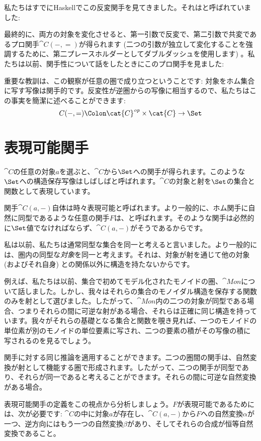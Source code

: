 私たちはすでにHaskellでこの反変関手を見てきました。それはと呼ばれていました: 


最終的に、両方の対象を変化させると、第一引数で反変で、第二引数で共変であるプロ関手$\cat{C}(-, =)$が得られます (二つの引数が独立して変化することを強調するために、第二プレースホルダーとしてダブルダッシュを使用します) 。私たちは以前、関手性について話をしたときにこのプロ関手を見ました: 

重要な教訓は、この観察が任意の圏で成り立つということです: 対象をホム集合に写す写像は関手的です。反変性が逆圏からの写像に相当するので、私たちはこの事実を簡潔に述べることができます: 
\[C(-, =) \Colon \cat{C}^\mathit{op} \times \cat{C} \to \Set\]

\section{表現可能関手}

$\cat{C}$の任意の対象$a$を選ぶと、$\cat{C}$から$\Set$への関手が得られます。このような$\Set$への構造保存写像はしばしばと呼ばれます。$\cat{C}$の対象と射を$\Set$の集合と関数として表現しています。

関手$\cat{C}(a, -)$自体は時々表現可能と呼ばれます。より一般的に、ホム関手に自然に同型であるような任意の関手$F$は、と呼ばれます。そのような関手は必然的に$\Set$値でなければならず、$\cat{C}(a, -)$がそうであるからです。

私は以前、私たちは通常同型な集合を同一と考えると言いました。より一般的には、圏内の同型な\emph{対象}を同一と考えます。それは、対象が射を通じて他の対象 (およびそれ自身) との関係以外に構造を持たないからです。

例えば、私たちは以前、集合で初めてモデル化されたモノイドの圏、$\cat{Mon}$について話しました。しかし、我々はそれらの集合のモノイダル構造を保存する関数のみを射として選びました。したがって、$\cat{Mon}$内の二つの対象が同型である場合、つまりそれらの間に可逆な射がある場合、それらは正確に同じ構造を持っています。我々がそれらの基礎となる集合と関数を覗き見れば、一つのモノイドの単位素が別のモノイドの単位要素に写され、二つの要素の積がその写像の積に写されるのを見るでしょう。

関手に対する同じ推論を適用することができます。二つの圏間の関手は、自然変換が射として機能する圏で形成されます。したがって、二つの関手が同型であり、それらが同一であると考えることができます。それらの間に可逆な自然変換がある場合。

表現可能関手の定義をこの視点から分析しましょう。$F$が表現可能であるためには、次が必要です: $\cat{C}$の中に対象$a$が存在し、$\cat{C}(a, -)$から$F$への自然変換$\alpha$が一つ、逆方向にはもう一つの自然変換$\beta$があり、そしてそれらの合成が恒等自然変換であること。

